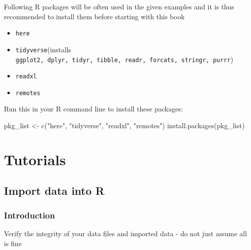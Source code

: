 \documentclass[
  letterpaper,
  DIV=11,
  numbers=noendperiod]{scrreprt}
\newenvironment{Shaded}{\begin{snugshade}}{\end{snugshade}}
\newcommand{\FunctionTok}[1]{\textcolor[rgb]{0.28,0.35,0.67}{#1}}
\newcommand{\NormalTok}[1]{\textcolor[rgb]{0.00,0.23,0.31}{#1}}
\newcommand{\OtherTok}[1]{\textcolor[rgb]{0.00,0.23,0.31}{#1}}
\newcommand{\StringTok}[1]{\textcolor[rgb]{0.13,0.47,0.30}{#1}}
\providecommand{\tightlist}{%
  \setlength{\itemsep}{0pt}\setlength{\parskip}{0pt}}\usepackage{longtable,booktabs,array}
\begin{document}
Following R packages will be often used in the given examples and it is
thus recommended to install them before starting with this book

\begin{itemize}
\tightlist
\item
  \texttt{here}
\item
  \texttt{tidyverse}(installs
  \texttt{ggplot2,\ dplyr,\ tidyr,\ tibble,\ readr,\ forcats,\ stringr,\ purrr})
\item
  \texttt{readxl}
\item
  \texttt{remotes}
\end{itemize}

Run this in your R command line to install these packages:

\begin{Shaded}
\begin{Highlighting}[]
\NormalTok{pkg\_list }\OtherTok{\textless{}{-}} \FunctionTok{c}\NormalTok{(}\StringTok{"here"}\NormalTok{, }\StringTok{"tidyverse"}\NormalTok{, }\StringTok{"readxl"}\NormalTok{, }\StringTok{"remotes"}\NormalTok{)}
\FunctionTok{install.packages}\NormalTok{(pkg\_list)}
\end{Highlighting}
\end{Shaded}

\part{Tutorials}

\hypertarget{import-data-into-r}{%
\chapter{Import data into R}\label{import-data-into-r}}

\hypertarget{introduction}{%
\section{Introduction}\label{introduction}}

\begin{tcolorbox}[enhanced jigsaw, colframe=quarto-callout-note-color-frame, breakable, bottomrule=.15mm, left=2mm, arc=.35mm, leftrule=.75mm, rightrule=.15mm, toprule=.15mm, opacityback=0, colback=white]
\begin{minipage}[t]{5.5mm}
\textcolor{quarto-callout-note-color}{\faInfo}
\end{minipage}%
\begin{minipage}[t]{\textwidth - 5.5mm}
Verify the integrity of your data files and imported data - do not just
assume all is fine\end{minipage}%
\end{tcolorbox}
\end{document}
